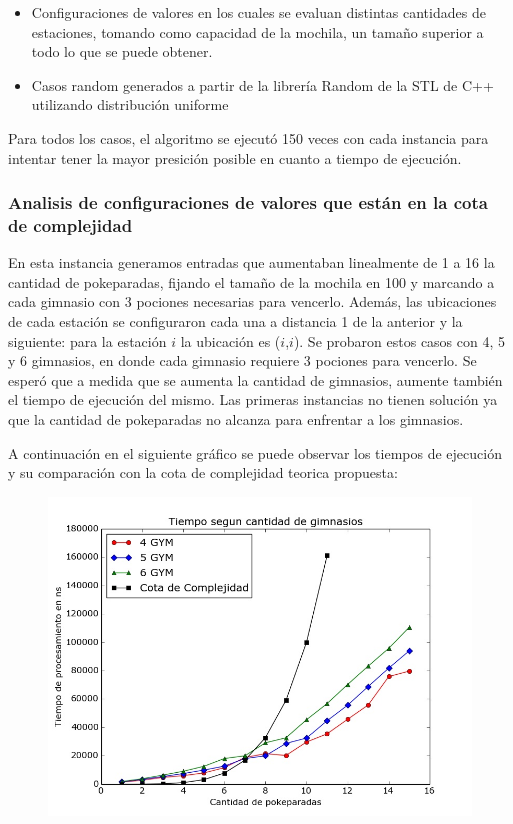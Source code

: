       \begin{itemize}
        \item Configuraciones de valores en los cuales se evaluan distintas cantidades de estaciones, tomando como capacidad de la mochila, un tamaño superior a todo lo que se puede obtener.
        \item Casos random generados a partir de la librería Random de la STL de C++ utilizando distribución uniforme
      \end{itemize}

      Para todos los casos, el algoritmo se ejecutó 150 veces con cada instancia para intentar tener la mayor presición posible en cuanto a tiempo de ejecución.

      \subsubsection{Analisis de configuraciones de valores que están en la cota de complejidad}
      En esta instancia generamos entradas que aumentaban linealmente de 1 a 16 la cantidad de pokeparadas, fijando el tamaño de la mochila en 100 y marcando a cada gimnasio con 3 pociones necesarias para vencerlo. Además, las ubicaciones de cada estación se configuraron cada una a distancia 1 de la anterior y la siguiente: para la estación $i$ la ubicación es ($i$,$i$).
      Se probaron estos casos con 4, 5 y 6 gimnasios, en donde cada gimnasio requiere 3 pociones para vencerlo. Se esperó que a medida que se aumenta la cantidad de gimnasios, aumente también el tiempo de ejecución del mismo. Las primeras instancias no tienen solución ya que la cantidad de pokeparadas no alcanza para enfrentar a los gimnasios.

      A continuación en el siguiente gráfico se puede observar los tiempos de ejecución y su comparación con la cota de complejidad teorica propuesta:


      \begin{figure}[H]
      \begin{center}
        \includegraphics[width=1.0\columnwidth]{imagenes/exp4_ej2.jpeg}
        \caption{}
      \end{center}
  \end{figure}

